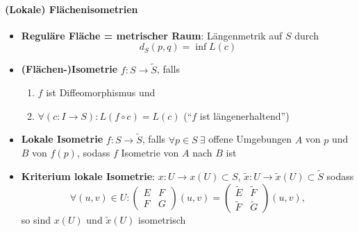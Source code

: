 \paragraph{(Lokale) Flächenisometrien}
\begin{itemize}
  \item \textbf{Reguläre Fläche = metrischer Raum}: Längenmetrik auf \( S \) durch
  \begin{equation*}
    d_S(p,q) = \inf L(c)
  \end{equation*}
  \item \textbf{(Flächen-)Isometrie} \( f: S \to \widetilde{S} \), falls
  \begin{enumerate}
    \item \( f \) ist Diffeomorphismus und
    \item \( \forall (c: I \to S) :  L(f \circ c) = L(c) \) (``\( f \) ist längenerhaltend'')
  \end{enumerate}
  \item \textbf{Lokale Isometrie} \( f: S \to \widetilde{S} \), falls \( \forall p \in S \ \exists \) offene Umgebungen \( A \) von \( p \) und \( B \) von \( f(p) \), sodass \( f \) Isometrie von \( A \) nach \( B \) ist
  \item \textbf{Kriterium lokale Isometrie}: \( x: U \to x(U) \subset S \), \( \widetilde{x}: U \to \widetilde{x}(U) \subset \widetilde{S} \) sodass
  \begin{equation*}
    \forall (u,v) \in U : \left( \begin{smallmatrix}
      E & F \\ F & G
    \end{smallmatrix} \right)(u,v) = \left( \begin{smallmatrix}
      \widetilde{E} & \widetilde{F} \\ \widetilde{F} & \widetilde{G}
    \end{smallmatrix} \right)(u,v),
  \end{equation*}
  so sind \( x(U) \) und \( \widetilde{x}(U) \) isometrisch
\end{itemize}

